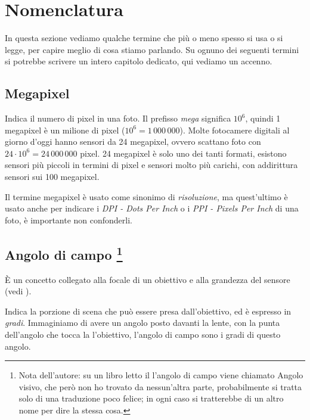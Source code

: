 \section{Nomenclatura} \label{sec:nomenclatura}

In questa sezione vediamo qualche termine che più o meno spesso si usa o si legge, per capire meglio di cosa stiamo parlando. Su ognuno dei seguenti termini si potrebbe scrivere un intero capitolo dedicato, qui vediamo un accenno.

\subsection{Megapixel} \label{subsec:megapixel}
Indica il numero di pixel in una foto. Il prefisso \textit{mega} significa $10^6$, quindi 1 megapixel è un milione di pixel ($10^6 = 1\,000\,000$).
Molte fotocamere digitali al giorno d'oggi hanno sensori da 24 megapixel, ovvero scattano foto con $24 \cdot 10^6 = 24\,000\,000$ pixel. 24 megapixel è solo uno dei tanti formati, esistono sensori più
piccoli in termini di pixel e sensori molto più carichi, con addirittura sensori sui 100 megapixel.

Il termine megapixel è usato come sinonimo di \textit{risoluzione}, ma quest'ultimo è usato anche per indicare i \textit{DPI - Dots Per Inch} o i \textit{PPI - Pixels Per Inch} di una foto, è importante non confonderli.


\subsection[Angolo di campo]{Angolo di campo \footnote{Nota dell'autore: su un libro letto il l'angolo di campo viene chiamato Angolo visivo, che però non ho trovato da nessun'altra parte, probabilmente si tratta solo di una traduzione poco felice; in ogni caso si tratterebbe di un altro nome per dire la stessa cosa.}} \label{subsec:angolocampo}

È un concetto collegato alla focale di un obiettivo e alla grandezza del sensore (vedi ).

Indica la porzione di scena che può essere presa dall'obiettivo, ed è espresso in \textit{gradi}. Immaginiamo di avere un angolo posto davanti la lente, con la punta dell'angolo che tocca la l'obiettivo,
l'angolo di campo sono i gradi di questo angolo.

